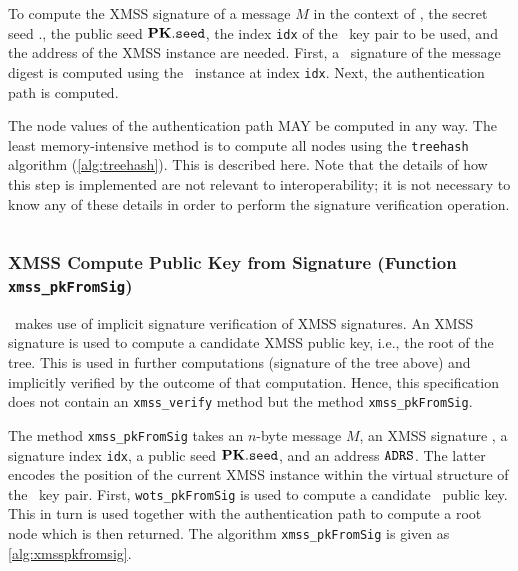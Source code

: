 To compute the XMSS signature of a message $M$ in the context of \SPHINCSA, the secret seed \sk.\seed, the public seed $\mathbf{PK}.\mathtt{seed}$, the index \texttt{idx} of the \WOTSCS\ key pair to be used, and the address \ADRS of the XMSS instance are needed. First, a \WOTSCS\ signature of the message digest is computed using the \WOTSCS\ instance at index \texttt{idx}. Next, the authentication path is computed.

The node values of the authentication path MAY be computed in any way. The least memory-intensive method is to compute all nodes using the \texttt{treehash} algorithm (\cref{alg:treehash}). This is described here. Note that the details of how this step is implemented are not relevant to interoperability; it is not necessary to know any of these details in order to perform the signature verification operation.

\begin{algorithm}
\inputminted[breaklines,linenos,tabsize=2,mathescape,escapeinside=||]{C}{code/xmss_sign.cs}
\caption{\texttt{xmss\_sign} --- Generating an XMSS signature.}
\label{alg:xmsssign}
\end{algorithm}

\subsubsection{XMSS Compute Public Key from Signature (Function \texttt{xmss\_pkFromSig})}

\SPHINCSA\ makes use of implicit signature verification of XMSS signatures. An XMSS signature is used to compute a candidate XMSS public key, i.e., the root of the tree. This is used in further computations (signature of the tree above) and implicitly verified by the outcome of that computation. Hence, this specification does not contain an \texttt{xmss\_verify} method but the method \texttt{xmss\_pkFromSig}.

The method \texttt{xmss\_pkFromSig} takes an $n$-byte message $M$, an XMSS signature \sigxmss, a signature index \texttt{idx}, a public seed $\mathbf{PK}.\mathtt{seed}$, and an address $\mathtt{ADRS}$. The latter encodes the position of the current XMSS instance within the virtual structure of the \SPHINCSA\ key pair. First, \texttt{wots\_pkFromSig} is used to compute a candidate \WOTSCS\ public key. This in turn is used together with the authentication path to compute a root node which is then returned. The algorithm \texttt{xmss\_pkFromSig} is given as \cref{alg:xmsspkfromsig}.

\begin{algorithm}
\inputminted[breaklines,linenos,tabsize=2,mathescape,escapeinside=||]{C}{code/xmss_pkFromSig.cs}
\caption{\texttt{xmss\_pkFromSig} --- Computing an XMSS public key from an XMSS signature.}
\label{alg:xmsspkfromsig}
\end{algorithm}





